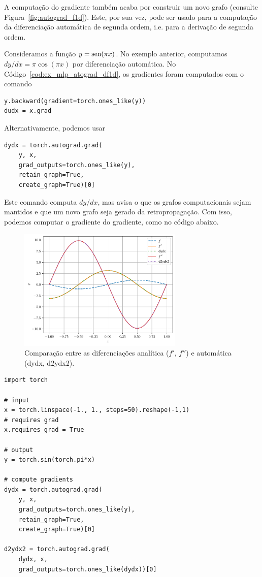 A computação do gradiente também acaba por construir um novo grafo (consulte Figura~\ref{fig:autograd_f1d}). Este, por sua vez, pode ser usado para a computação da diferenciação automática de segunda ordem, i.e. para a derivação de segunda ordem.

\begin{ex}\label{ex:mlp_autograd_d2f1d}
  Consideramos a função $y = \operatorname{sen}(\pi x)$. No exemplo anterior, computamos $dy/dx = \pi\cos(\pi x)$ por diferenciação automática. No Código~\ref{cod:ex_mlp_atograd_df1d}, os gradientes foram computados com o comando
\begin{lstlisting}
y.backward(gradient=torch.ones_like(y))
dudx = x.grad
\end{lstlisting}
  Alternativamente, podemos usar
\begin{lstlisting}
dydx = torch.autograd.grad(
    y, x,
    grad_outputs=torch.ones_like(y),
    retain_graph=True,
    create_graph=True)[0]
\end{lstlisting}
  Este comando computa $dy/dx$, mas avisa o {\pytorch} que os grafos computacionais sejam mantidos e que um novo grafo seja gerado da retropropagação. Com isso, podemos computar o gradiente do gradiente, como no código abaixo.

  \begin{figure}[H]
    \centering
    \includegraphics[width=0.7\textwidth]{cap_mlp/dados/ex_mlp_autograd_d2f1d/fig}
    \caption{Comparação entre as diferenciações analítica ($f'$, $f''$) e automática (dydx, d2ydx2).}
    \label{fig:ex_mlp_autograd_d2f1d}
  \end{figure}  

\begin{lstlisting}[caption=mlp\_autograd\_d2f1d]
import torch

# input
x = torch.linspace(-1., 1., steps=50).reshape(-1,1)
# requires grad
x.requires_grad = True

# output
y = torch.sin(torch.pi*x)

# compute gradients
dydx = torch.autograd.grad(
    y, x,
    grad_outputs=torch.ones_like(y),
    retain_graph=True,
    create_graph=True)[0]

d2ydx2 = torch.autograd.grad(
    dydx, x,
    grad_outputs=torch.ones_like(dydx))[0]
\end{lstlisting}
\end{ex}


